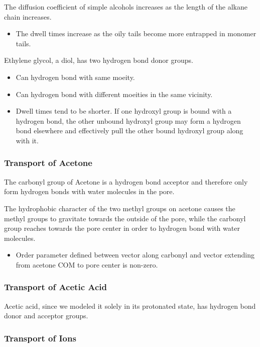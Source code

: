 \documentclass{article}
\begin{document}
  The diffusion coefficient of simple alcohols increases as the length of 
  the alkane chain increases.
  \begin{itemize}
	\item The dwell times increase as the oily tails become more
	entrapped in monomer tails.
  \end{itemize}

  Ethylene glycol, a diol, has two hydrogen bond donor groups.
  \begin{itemize}
	\item Can hydrogen bond with same moeity.
	\item Can hydrogen bond with different moeities in the same 
	vicinity. 
	\item Dwell times tend to be shorter. If one hydroxyl group is bound
	with a hydrogen bond, the other unbound hydroxyl group may form a hydrogen bond
	elsewhere and effectively pull the other bound hydroxyl group along with it. 
  \end{itemize}

  \subsubsection*{Transport of Acetone}

  The carbonyl group of Acetone is a hydrogen bond acceptor and therefore only
  form hydrogen bonds with water molecules in the pore. 

  The hydrophobic character of the two methyl groups on acetone causes the methyl
  groups to gravitate towards the outside of the pore, while the carbonyl group
  reaches towards the pore center in order to hydrogen bond with water molecules.
  \begin{itemize}
	\item Order parameter defined between vector along carbonyl and vector extending
	from acetone COM to pore center is non-zero.
  \end{itemize} 

  \subsubsection*{Transport of Acetic Acid}

  Acetic acid, since we modeled it solely in its protonated state, has hydrogen
  bond donor and acceptor groups. 

  \subsubsection*{Transport of Ions} %
\end{document}
